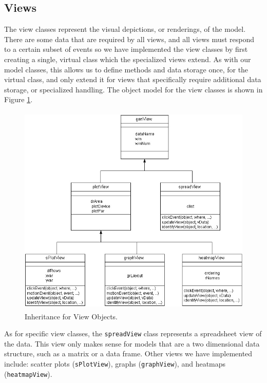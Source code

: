 \documentclass[11pt]{article}
\newcommand{\Rclass}[1]{\texttt{#1}}
\begin{document}
\subsection{Views}\label{Ssec:OneViews}

The view classes represent the visual depictions, or renderings, of
the model.  There are some data that are required by all views, and all views
must respond to a certain subset of events so we have implemented the view
classes by first creating a single, virtual class which the specialized
views extend.  As with our model classes, this allows us to define
methods and data storage once, for the virtual class, and only extend
it for views that specifically require additional data storage, or
specialized handling.  The object model for the view classes is shown
in Figure \ref{Fig:View}.

\begin{figure}[ht]
  \begin{center}
    \includegraphics[height=4in, width=5in]{newViewClass.jpg}
    \caption{ Inheritance for View Objects. }
    \label{Fig:View}
  \end{center}
\end{figure}

As for specific view classes, the \Rclass{spreadView} class represents
a spreadsheet view of the data.  This view only makes sense for models
that are a two dimensional data structure, such as a matrix or a data
frame. Other views we have implemented include: scatter plots
(\Rclass{sPlotView}), graphs (\Rclass{graphView}), and heatmaps
(\Rclass{heatmapView}).
\end{document}
